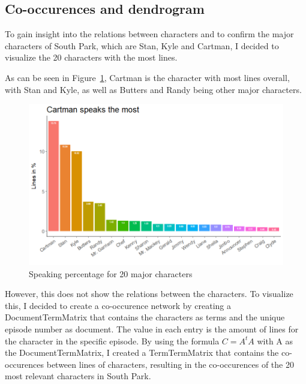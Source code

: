 \documentclass[10pt,a4paper]{article}
\begin{document}
	
	
	\subsection{Co-occurences and dendrogram}
	To gain insight into the relations between characters and to confirm the major characters of South Park, which are Stan, Kyle and Cartman, I decided to visualize the 20 characters with the most lines.
	
	As can be seen in Figure~\ref{fig:SpeakingPercentage}, Cartman is the character with most lines overall, with Stan and Kyle, as well as Butters and Randy being other major characters.
	
	\begin{figure}[h]
	\centering
	\includegraphics[scale=0.5]{images/speakingPercentage.png}
	\caption{Speaking percentage for 20 major characters}
	\label{fig:SpeakingPercentage}
	\end{figure}	
	
	
	However, this does not show the relations between the characters. To visualize this, I decided to create a co-occurence network by creating a DocumentTermMatrix that contains the characters as terms and the unique episode number as document. The value in each entry is the amount of lines for the character in the specific episode. By using the formula $C = A^tA$ with A as the DocumentTermMatrix, I created a TermTermMatrix that contains the co-occurences between lines of characters, resulting in the co-occurences of the 20 most relevant characters in South Park.
	
\end{document}
